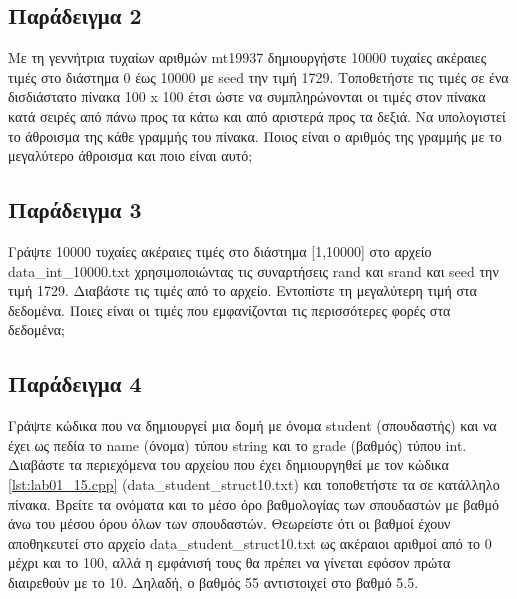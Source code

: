 



\subsection{Παράδειγμα 2}
Με τη γεννήτρια τυχαίων αριθμών mt19937 δημιουργήστε 10000 τυχαίες ακέραιες τιμές στο διάστημα 0 έως 10000 με seed την τιμή 1729. Τοποθετήστε τις τιμές σε ένα δισδιάστατο πίνακα 100 x 100 έτσι ώστε να συμπληρώνονται οι τιμές στον πίνακα κατά σειρές από πάνω προς τα κάτω και από αριστερά προς τα δεξιά. Να υπολογιστεί το άθροισμα της κάθε γραμμής του πίνακα. Ποιος είναι ο αριθμός της γραμμής με το μεγαλύτερο άθροισμα και ποιο είναι αυτό;





\subsection{Παράδειγμα 3}
Γράψτε 10000 τυχαίες ακέραιες τιμές στο διάστημα [1,10000] στο αρχείο data\_int\_10000.txt χρησιμοποιώντας τις συναρτήσεις rand και srand και seed την τιμή 1729. Διαβάστε τις τιμές από το αρχείο. Εντοπίστε τη μεγαλύτερη τιμή στα δεδομένα. Ποιες είναι οι τιμές  που εμφανίζονται τις περισσότερες φορές στα δεδομένα;




 
\subsection{Παράδειγμα 4}
Γράψτε κώδικα που να δημιουργεί μια δομή με όνομα student (σπουδαστής) και να έχει ως πεδία το name (όνομα) τύπου string και το grade (βαθμός) τύπου int. Διαβάστε τα περιεχόμενα του αρχείου που έχει δημιουργηθεί με τον κώδικα \ref{lst:lab01_15.cpp} (data\_student\_struct10.txt) και τοποθετήστε τα σε κατάλληλο πίνακα. Βρείτε τα ονόματα και το μέσο όρο βαθμολογίας των σπουδαστών με βαθμό άνω του μέσου όρου όλων των σπουδαστών. Θεωρείστε ότι οι βαθμοί έχουν αποθηκευτεί στο αρχείο data\_student\_struct10.txt ως ακέραιοι αριθμοί από το 0 μέχρι και το 100, αλλά η εμφάνισή τους θα πρέπει να γίνεται εφόσον πρώτα διαιρεθούν με το 10. Δηλαδή, ο βαθμός 55 αντιστοιχεί στο βαθμό 5.5.

